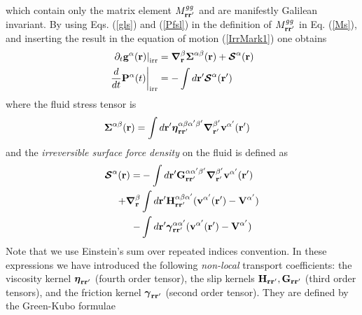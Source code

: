 \documentclass[b5paper,openright,11pt]{book}
\begin{document}
which contain only  the matrix element $M^{gg}_{{\bf  r}{\bf r}'}$ and are
manifestly  Galilean   invariant.   By  using  Eqs.   (\ref{gls})  and
(\ref{Pfsl}) {in} the  definition  of $M^{gg}_{{\bf  r}{\bf r}'}$  in
Eq. (\ref{Ms}),  and inserting  the result in  the equation  of motion
(\ref{IrrMark1}) one obtains
\begin{align}
\left.  \partial_t{\bf g}^\alpha({\bf r})\right|_{\rm irr}&= \boldsymbol{\nabla}_{\bf r}^{\beta}\boldsymbol{\Sigma}^{\alpha\beta}({\bf r}) +\boldsymbol{{\cal S}}^\alpha({\bf r}) 
\nonumber\\
\left.\frac{d}{dt}{\bf P}^\alpha(t)\right|_{\rm irr}&=-\int d{\bf r}'   \boldsymbol{{\cal S}}^\alpha({\bf r}')
\label{Irr}
\end{align}
where the fluid stress tensor is
\begin{align}
  \boldsymbol{\Sigma}^{\alpha\beta}({\bf r})&=
\int d{\bf r}'
\boldsymbol{\eta}^{\alpha\beta\alpha'\beta'}_{{\bf r}{\bf r}'}
\boldsymbol{\nabla}_{{\bf r}'}^{\beta'}{\bf v}^{\alpha'}({\bf r}')
\label{FluidStress}
\end{align}
and the \textit{irreversible surface force density} on the fluid is defined as
\begin{align}
\boldsymbol{{\cal S}}^\alpha({\bf r})=&
-\int d{\bf r}'{\bf G}^{\alpha\alpha'\beta'}_{{\bf r}{\bf r}'}
\boldsymbol{\nabla}_{{\bf r}'}^{\beta'} {\bf v}^{\alpha'}({\bf r}')
\nonumber\\
+\boldsymbol{\nabla}_{{\bf r}}^{\beta}&\int d{\bf r}'{\bf H}^{\alpha\beta\alpha'}_{{\bf r}{\bf r}'}
( {\bf v}^{\alpha'}({\bf r}')-{\bf V}^{\alpha'})
\nonumber\\
-&\int d{\bf r}'
\boldsymbol{\gamma}^{\alpha\alpha'}_{{\bf r}{\bf r}'}( {\bf v}^{\alpha'}({\bf r}')
-{\bf V}^{\alpha'})
\label{Irreversibleforces}
\end{align}
Note that we use Einstein's sum over repeated indices convention.
In   these    expressions   we    have   introduced    the   following
\textit{non-local}  transport   coefficients:  the   viscosity  kernel
$\boldsymbol{\eta}_{{\bf r}{\bf r}'}$ (fourth  order tensor), the slip
kernels ${\bf  H}_{{\bf r}{\bf r}'},{\bf G}_{{\bf  r}{\bf r}'}$ (third
order  tensors), and  the  friction kernel  $\boldsymbol{\gamma}_{{\bf
    r}{\bf  r}'}$ (second  order  tensor).  They  are  defined by  the
Green-Kubo formulae
\end{document}
